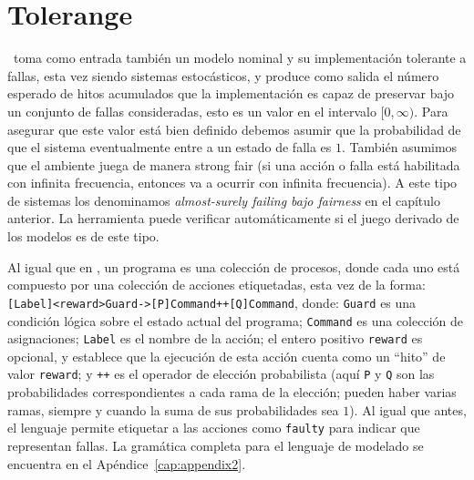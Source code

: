 \section{Tolerange} \label{sec:tolerange}

\Tolerange~toma como entrada también un modelo nominal y su implementación tolerante a fallas, esta vez siendo sistemas estocásticos, 
y produce como salida el número esperado de hitos acumulados que la implementación es capaz de preservar bajo un conjunto de fallas consideradas, esto es un valor en el intervalo $[0,\infty)$. Para asegurar que este valor está bien definido debemos asumir que la probabilidad de que el sistema eventualmente entre a un estado de falla es $1$. También asumimos que el ambiente juega de manera strong fair (si una acción o falla está habilitada con infinita frecuencia, entonces va a ocurrir con infinita frecuencia). A este tipo de sistemas los denominamos \emph{almost-surely failing bajo fairness} en el capítulo anterior. La herramienta puede verificar automáticamente si el juego derivado de los modelos es de este tipo.

Al igual que en {\MaskD}, un programa es una colección de procesos, donde cada uno está compuesto por una colección de acciones etiquetadas, esta vez de la forma: \verb"[Label]<reward>Guard->[P]Command++[Q]Command", donde: \verb"Guard" es una condición lógica sobre el estado actual del programa; \verb"Command" es 
una colección de asignaciones; \verb"Label" es el nombre de la acción; el entero positivo  \verb"reward" es 
opcional, y establece que la ejecución de esta acción cuenta como un ``hito'' de valor \verb"reward"; y \verb"++" es el operador de elección probabilista (aquí \verb"P" y \verb"Q" son las probabilidades correspondientes a cada rama de la elección; pueden haber varias ramas, siempre y cuando la suma de sus probabilidades sea $1$).
Al igual que antes, el lenguaje permite etiquetar a las acciones como \verb"faulty" para indicar que representan fallas. La gramática completa para el lenguaje de modelado se encuentra en el Apéndice~\ref{cap:appendix2}.

